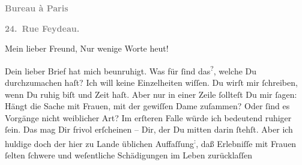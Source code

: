 \pstart
           \begin{otherlanguage}{french}\textcolor{gray}{\textbf{\textbf{Bureau à Paris}}}\end{otherlanguage}\pend
           
\pstart
           \begin{otherlanguage}{french}\textcolor{gray}{\textbf{\textbf{24. Rue Feydeau.}}}\end{otherlanguage}\pend
           
\pstart\center{}Mein lieber Freund,\pend\vspace{0.5em}
\pstart
           Nur wenige Worte heut!\pend
           
\pstart
           Dein lieber Brief hat mich beunruhigt. Was für \label{K_L02801-1v}\label{K_L02801-1} ſind das\substVorne{}\textsuperscript{?}\substDazwischen{},\substHinten{} welche Du durchzumachen haſt? Ich will keine Einzelheiten wiſſen. Du wirſt
               mir ſchreiben, wenn Du ruhig biſt und Zeit haſt. Aber nur in einer Zeile ſollteſt Du
               mir ſagen: Hängt die Sache mit Frauen, mit der gewiſſen Dame zuſammen? Oder ſind es Vorgänge nicht
               weiblicher Art? Im erſteren Falle würde ich bedeutend ruhiger  ſein. Das mag Dir frivol erſcheinen – Dir, der Du mitten darin ſtehſt. Aber
               ich {\pb}huldige doch der hier zu Lande üblichen Auffaſſung\substVorne{}\textsuperscript{:}\substDazwischen{},\substHinten{} daß Erlebniſſe mit Frauen ſelten ſchwere und weſentliche Schädigungen im
               Leben zurücklaſſen{\dotsfour}\pend
           
